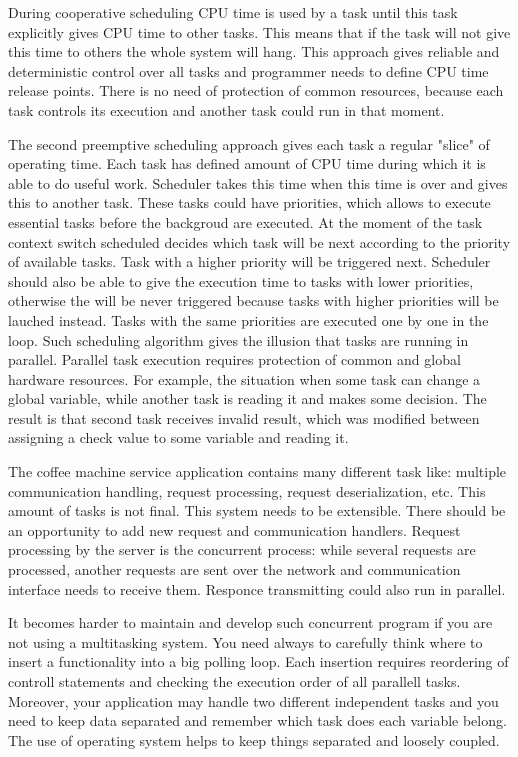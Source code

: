 During cooperative scheduling CPU time is used by a task until this task explicitly gives CPU time to other tasks.
This means that if the task will not give this time to others the whole system will hang.
This approach gives reliable and deterministic control over all tasks  and programmer needs to define CPU time release points.
There is no need of protection of common resources, because each task controls its execution and another task could run in that moment.

The second preemptive scheduling approach gives each task a regular "slice" of operating time. 
Each task has defined amount of CPU time during which it is able to do useful work.
Scheduler takes this time when this time is over and gives this to another task.
These tasks could have priorities, which allows to execute essential tasks before the backgroud are executed.
At the moment of the task context switch scheduled decides which task will be next according to the priority of available tasks.
Task with a higher priority will be triggered next. 
Scheduler should also be able to give the execution time to tasks with lower priorities, otherwise the will be never triggered because tasks with higher priorities will be lauched instead.
Tasks with the same priorities are executed one by one in the loop\cite{barry2010using}.
Such scheduling algorithm gives the illusion that tasks are running in parallel.
Parallel task execution requires protection of common and global hardware resources. 
For example, the situation when some task can change a global variable, while another task is reading it and makes some decision.
The result is that second task receives invalid result, which was modified between assigning a check value to some variable and reading it.


The coffee machine service application contains many different task like: 
multiple communication handling,
request processing,
request deserialization, etc.
This amount of tasks is not final.
This system needs to be extensible.
There should be an opportunity to add new request and communication handlers.
Request processing by the server is the concurrent process: while several requests are processed, another requests are sent over the network and communication interface needs to receive them.
Responce transmitting could also run in parallel.

It becomes harder to maintain and develop such concurrent program if you are not using a multitasking system. 
You need always to carefully think where to insert a functionality into a big polling loop.
Each insertion requires reordering of controll statements and checking the execution order of all parallell tasks.
Moreover, your application may handle two different independent tasks and you need to keep data separated and remember which task does each variable belong.
The use of operating system helps to keep things separated and loosely coupled.
 

